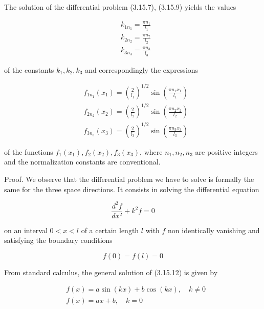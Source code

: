 \documentclass{article}
\begin{document}
The solution of the differential problem (3.15.7), (3.15.9) yields the values
 
\begin{align*}
& k_{1 n_{1}}=\frac{\pi n_{1}}{l_{1}}  \tag{3.15.10a}\\
& k_{2 n_{2}}=\frac{\pi n_{2}}{l_{2}}  \tag{3.15.10b}\\
& k_{3 n_{3}}=\frac{\pi n_{3}}{l_{3}} \tag{3.15.10c}
\end{align*}
 
of the constants $k_{1}, k_{2}, k_{3}$ and correspondingly the expressions
 
\begin{align*}
& f_{1 n_{1}}\left(x_{1}\right)=\left(\frac{2}{l_{1}}\right)^{1 / 2} \sin \left(\frac{\pi n_{1} x_{1}}{l_{1}}\right)  \tag{3.15.11a}\\
& f_{2 n_{2}}\left(x_{2}\right)=\left(\frac{2}{l_{2}}\right)^{1 / 2} \sin \left(\frac{\pi n_{2} x_{2}}{l_{2}}\right)  \tag{3.15.11b}\\
& f_{3 n_{3}}\left(x_{3}\right)=\left(\frac{2}{l_{3}}\right)^{1 / 2} \sin \left(\frac{\pi n_{3} x_{3}}{l_{3}}\right) \tag{3.15.11c}
\end{align*}
 
of the functions $f_{1}\left(x_{1}\right), f_{2}\left(x_{2}\right), f_{3}\left(x_{3}\right)$, where $n_{1}, n_{2}, n_{3}$ are positive integers and the normalization constants are conventional.

Proof. We observe that the differential problem we have to solve is formally the same for the three space directions. It consists in solving the differential equation
 
\begin{equation*}
\frac{d^{2} f}{d x^{2}}+k^{2} f=0 \tag{3.15.12}
\end{equation*}
 
on an interval $0<x<l$ of a certain length $l$ with $f$ non identically vanishing and satisfying the boundary conditions
 
\begin{equation*}
f(0)=f(l)=0 \tag{3.15.13}
\end{equation*}
 

From standard calculus, the general solution of (3.15.12) is given by
 
\begin{align*}
& f(x)=a \sin (k x)+b \cos (k x), \quad k \neq 0  \tag{3.15.14a}\\
& f(x)=a x+b, \quad k=0 \tag{3.15.14b}
\end{align*}
 
\end{document}
